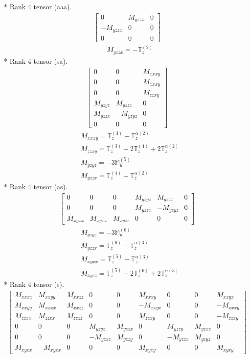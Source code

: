 \documentclass[fleqn,8pt,landscape]{jsarticle}
\begin{document}
* Rank 4 tensor (aaa).
\begin{align*}
\begin{bmatrix} 0 & M_{yzzx} & 0 \\ - M_{yzzx} & 0 & 0 \\ 0 & 0 & 0 \end{bmatrix}
\end{align*}
\begin{align*}
& M_{yzzx} = - \mathbb{T}_{z}^{(2)}
\end{align*}
* Rank 4 tensor (sa).
\begin{align*}
\begin{bmatrix} 0 & 0 & M_{xxxy} \\ 0 & 0 & M_{xxxy} \\ 0 & 0 & M_{zzxy} \\ M_{yzyz} & M_{yzzx} & 0 \\ M_{yzzx} & - M_{yzyz} & 0 \\ 0 & 0 & 0 \end{bmatrix}
\end{align*}
\begin{align*}
& M_{xxxy} = \mathbb{T}_{z}^{(3)} - \mathbb{T}_{z}^{\alpha(2)} \\
& M_{zzxy} = \mathbb{T}_{z}^{(3)} + 2 \mathbb{T}_{z}^{(4)} + 2 \mathbb{T}_{z}^{\alpha(2)} \\
& M_{yzyz} = - 3 \mathbb{M}_{u}^{(5)} \\
& M_{yzzx} = \mathbb{T}_{z}^{(4)} - \mathbb{T}_{z}^{\alpha(2)}
\end{align*}
* Rank 4 tensor (as).
\begin{align*}
\begin{bmatrix} 0 & 0 & 0 & M_{yzyz} & M_{yzzx} & 0 \\ 0 & 0 & 0 & M_{yzzx} & - M_{yzyz} & 0 \\ M_{xyxx} & M_{xyxx} & M_{xyzz} & 0 & 0 & 0 \end{bmatrix}
\end{align*}
\begin{align*}
& M_{yzyz} = - 3 \mathbb{M}_{u}^{(6)} \\
& M_{yzzx} = \mathbb{T}_{z}^{(6)} - \mathbb{T}_{z}^{\alpha(3)} \\
& M_{xyxx} = \mathbb{T}_{z}^{(5)} - \mathbb{T}_{z}^{\alpha(3)} \\
& M_{xyzz} = \mathbb{T}_{z}^{(5)} + 2 \mathbb{T}_{z}^{(6)} + 2 \mathbb{T}_{z}^{\alpha(3)}
\end{align*}
* Rank 4 tensor (s).
\begin{align*}
\begin{bmatrix} M_{xxxx} & M_{xxyy} & M_{xxzz} & 0 & 0 & M_{xxxy} & 0 & 0 & M_{xxyx} \\ M_{xxyy} & M_{xxxx} & M_{xxzz} & 0 & 0 & - M_{xxyx} & 0 & 0 & - M_{xxxy} \\ M_{zzxx} & M_{zzxx} & M_{zzzz} & 0 & 0 & M_{zzxy} & 0 & 0 & - M_{zzxy} \\ 0 & 0 & 0 & M_{yzyz} & M_{yzzx} & 0 & M_{yzzy} & M_{yzxz} & 0 \\ 0 & 0 & 0 & - M_{yzxz} & M_{yzzy} & 0 & - M_{yzzx} & M_{yzyz} & 0 \\ M_{xyxx} & - M_{xyxx} & 0 & 0 & 0 & M_{xyxy} & 0 & 0 & M_{xyxy} \end{bmatrix}
\end{align*}
\end{document}
